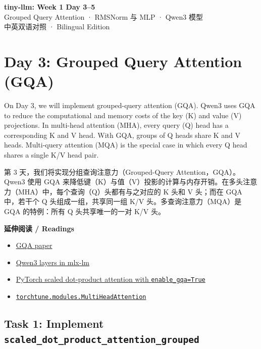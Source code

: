 \documentclass[11pt,a4paper]{article}
\newenvironment{zhpar}{%
  \par\smallskip\begingroup\color{zhcolor}\small\ignorespaces%
}{\endgroup\par\smallskip}
\begin{document}
\begin{center}
{\LARGE\bfseries\sffamily tiny-llm: Week 1 Day 3--5}\\[0.4em]
{\large\sffamily Grouped Query Attention · RMSNorm 与 MLP · Qwen3 模型}\\[0.3em]
{\small\sffamily 中英双语对照 · Bilingual Edition}
\end{center}
\vspace{0.6em}
\section*{Day 3: Grouped Query Attention (GQA)}

On Day 3, we will implement grouped-query attention (GQA). Qwen3 uses GQA to reduce the computational and memory costs of the key (K) and value (V) projections. In multi-head attention (MHA), every query (Q) head has a corresponding K and V head. With GQA, groups of Q heads share K and V heads. Multi-query attention (MQA) is the special case in which every Q head shares a single K/V head pair.

\begin{zhpar}
第 3 天，我们将实现分组查询注意力（Grouped-Query Attention，GQA）。Qwen3 使用 GQA 来降低键（K）与值（V）投影的计算与内存开销。在多头注意力（MHA）中，每个查询（Q）头都有与之对应的 K 头和 V 头；而在 GQA 中，若干个 Q 头组成一组，共享同一组 K/V 头。多查询注意力（MQA）是 GQA 的特例：所有 Q 头共享唯一的一对 K/V 头。
\end{zhpar}
\textbf{延伸阅读 / Readings}

\begin{itemize}[leftmargin=1.6em,itemsep=0.15em,parsep=0pt]
\item \href{https://arxiv.org/abs/2305.13245}{GQA paper}
\item \href{https://github.com/ml-explore/mlx-lm/blob/main/mlx_lm/models/qwen3.py}{Qwen3 layers in mlx-lm}
\item \href{https://pytorch.org/docs/stable/generated/torch.nn.functional.scaled_dot_product_attention.html}{PyTorch scaled dot-product attention with \texttt{enable\_gqa=True}}
\item \href{https://pytorch.org/torchtune/0.3/generated/torchtune.modules.MultiHeadAttention.html}{\texttt{torchtune.modules.MultiHeadAttention}}
\end{itemize}

\subsection*{Task 1: Implement \texttt{scaled\_dot\_product\_attention\_grouped}}
\end{document}
